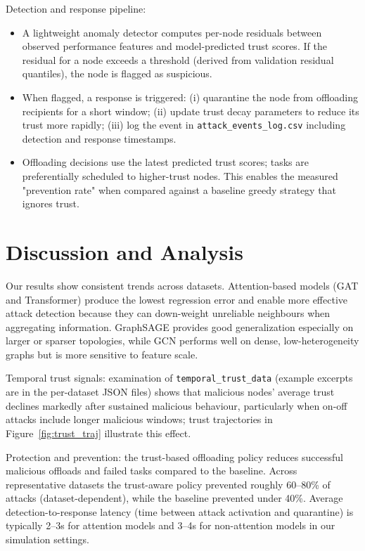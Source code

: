 \documentclass[12pt,a4paper]{article}
\begin{document}
Detection and response pipeline:
\begin{itemize}
  \item A lightweight anomaly detector computes per-node residuals between observed performance features and model-predicted trust scores. If the residual for a node exceeds a threshold (derived from validation residual quantiles), the node is flagged as suspicious.
  \item When flagged, a response is triggered: (i) quarantine the node from offloading recipients for a short window; (ii) update trust decay parameters to reduce its trust more rapidly; (iii) log the event in \texttt{attack\_events\_log.csv} including detection and response timestamps.
  \item Offloading decisions use the latest predicted trust scores; tasks are preferentially scheduled to higher-trust nodes. This enables the measured "prevention rate" when compared against a baseline greedy strategy that ignores trust.
\end{itemize}

\section{Discussion and Analysis}
Our results show consistent trends across datasets. Attention-based models (GAT and Transformer) produce the lowest regression error and enable more effective attack detection because they can down-weight unreliable neighbours when aggregating information. GraphSAGE provides good generalization especially on larger or sparser topologies, while GCN performs well on dense, low-heterogeneity graphs but is more sensitive to feature scale.

Temporal trust signals: examination of \texttt{temporal\_trust\_data} (example excerpts are in the per-dataset JSON files) shows that malicious nodes' average trust declines markedly after sustained malicious behaviour, particularly when on-off attacks include longer malicious windows; trust trajectories in Figure~\ref{fig:trust_traj} illustrate this effect.

Protection and prevention: the trust-based offloading policy reduces successful malicious offloads and failed tasks compared to the baseline. Across representative datasets the trust-aware policy prevented roughly 60--80\% of attacks (dataset-dependent), while the baseline prevented under 40\%. Average detection-to-response latency (time between attack activation and quarantine) is typically 2--3s for attention models and 3--4s for non-attention models in our simulation settings.
\end{document}
